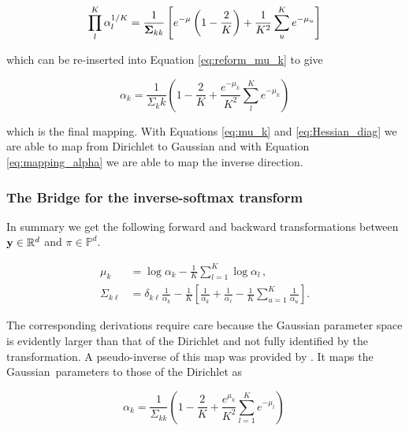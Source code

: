 \begin{equation}
\prod_l^K \alpha_l^{1/K} = \frac{1}{{\boldsymbol{\Sigma}}_{kk}} \left[e^{-\mu}\left(1 - \frac{2}{K}\right)  + \frac{1}{K^2} \sum_u^K e^{-\mu_u} \right]
\end{equation}

which can be re-inserted into Equation \ref{eq:reform_mu_k} to give

\begin{equation}
\label{eq:mapping_alpha}
\alpha_k = \frac{1}{\Sigma_kk} \left(1 - \frac{2}{K} + \frac{e^{-\mu_k}}{K^2} \sum_l^K e^{-\mu_k} \right)
\end{equation}

which is the final mapping. With Equations \ref{eq:mu_k} and \ref{eq:Hessian_diag} we are able to map from Dirichlet to Gaussian and with Equation \ref{eq:mapping_alpha} we are able to map the inverse direction. 

\subsubsection{The Bridge for the inverse-softmax transform}

In summary we get the following forward and backward transformations between $\mathbf{y} \in \mathbb{R}^d$ and $\pi \in \mathbb{P}^d$.

\begin{subequations}
\begin{align}
	\mu_k &= \log \alpha_k  - \frac{1}{K} \sum_{l=1}^{K} \log \alpha_l \, , \label{eq:mubridge}\\
	\Sigma_{k\ell} &= \delta_{k\ell}\frac{1}{\alpha_k} - \frac{1}{K}\left[\frac{1}{\alpha_k} + \frac{1}{\alpha_\ell} - \frac{1}{K}\sum_{u=1} ^K \frac{1}{\alpha_u} \right].
	\label{eq:Sigmabridge} 
\end{align}
\end{subequations}

The corresponding derivations require care because the Gaussian parameter space is evidently larger than that of the Dirichlet and not fully identified by the transformation.
A pseudo-inverse of this map was provided by \citet{KernelTopicModels2012}. It maps the Gaussian parameters to those of the Dirichlet as

\begin{equation} \label{eq:alpha_transform}
	\alpha_k = \frac{1}{\Sigma_{kk}}\left(1 - \frac{2}{K} + \frac{e^{\mu_k}}{K^2}\sum_{l=1}^K e^{-\mu_l} \right) \,
\end{equation}
